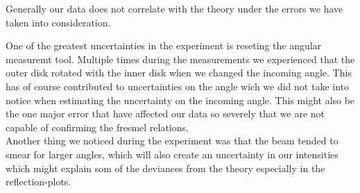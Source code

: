 
Generally our data does not correlate with the theory under the errors we have taken into consideration. 


One of the greatest uncertainties in the experiment is reseting the angular measuremt tool. Multiple times during the measurements we experienced that the outer disk rotated with the inner disk when we changed the incoming angle. This has of course contributed to uncertainties on the angle wich we did not take into notice when estimating the uncertainty on the incoming angle. This might also be the one major error that have affected our data so severely that we are not capable of confirming the fresmel relations.\\

Another thing we noticed during the experiment was that the beam tended to smear for larger angles, which will also create an uncertainty in our intensities which might explain som of the deviances from the theory especially in the reflection-plots. 